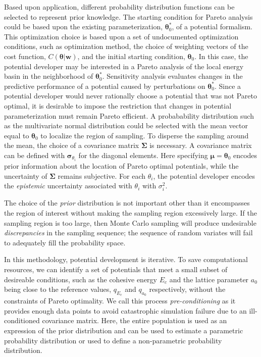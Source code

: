 Based upon application, different probability distribution functions can be selected to represent prior knowledge.  The starting condition for Pareto analysis could be based upon the existing parameterization, $\bm{\theta}_0^*$, of a potential formalism.  This optimization choice is based upon a set of undocumented optimization conditions, such as optimization method, the choice of weighting vectors of the cost function, $C(\bm{\theta}|\bm{w})$, and the initial starting condition, $\bm{\theta}_0$.  In this case, the potential developer may be interested in a Pareto analysis of the local energy basin in the neighborhood of  $\bm{\theta}_0^*$.  Sensitivity analysis evaluates changes in the predictive performance of a potential caused by perturbations on $\bm{\theta}_0^*$.  Since a potential developer would never rationally choose a potential that was not Pareto optimal, it is desirable to impose the restriction that changes in potential parameterization must remain Pareto efficient.  A probabability distribution such as the multivariate normal distribution could be selected with the mean vector equal to $\bm{\theta}_0$ to localize the region of sampling.  To disperse the sampling around the mean, the choice of a covariance matrix $\bm{\Sigma}$ is necessary.  A covariance matrix can be defined with $\bm{\sigma}_{\theta_i}$ for the diagonal elements.
Here specifying $\bm{\mu} = \bm{\theta}_0$ encodes prior information about the location of Pareto optimal potentials, while the uncertainty of $\bm{\Sigma}$ remains subjective.  For each $\theta_i$, the potential developer encodes the \emph{epistemic} uncertainty associated with $\theta_i$ with $\sigma_i^2$.

The choice of the \emph{prior} distribution is not important other than it encompasses the region of interest without making the sampling region excessively large.  If the sampling region is too large, then Monte Carlo sampling will produce undesirable \emph{discrepancies} in the sampling sequence; the sequence of random variates will fail to adequately fill the probability space.

In this methodology, potential development is iterative.  To save computational resources, we can identify a set of potentials that meet a small subset of desireable conditions, such as the cohesive energy $E_c$ and the lattice parameter $a_0$ being close to the reference values, $q_{E_c}$ and $q_{a_0}$ respectively, without the constraints of Pareto optimality.  We call this process \emph{pre-conditioning} as it provides enough data points to avoid catastrophic simulation failure due to an ill-conditioned covariance matrix.  Here, the entire population is used as an expression of the prior distribution and can be used to estimate a parametric probability distribution or used to define a non-parametric probability distribution.


